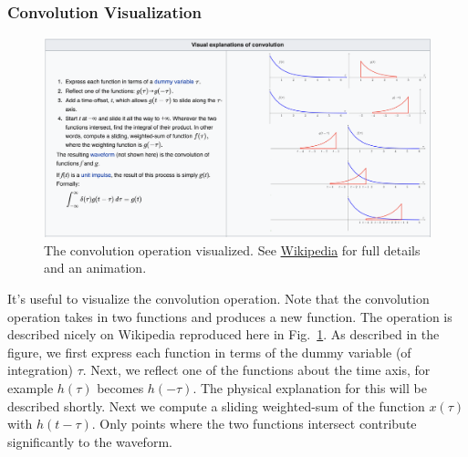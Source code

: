 \subsubsection{Convolution Visualization}
\begin{figure}[tb]
\centering
\includegraphics[width=\columnwidth]{conv_picture.png} 
\caption{The convolution operation visualized.  See \href{https://en.wikipedia.org/wiki/Convolution}{Wikipedia} for full details and an animation. }
\label{fig:conv_visual}
\end{figure}
It's useful to visualize the convolution operation.  Note that the convolution operation takes in two functions and produces a new function.  The operation is described nicely on Wikipedia reproduced here in Fig.~\ref{fig:conv_visual}.  As described in the figure, we first express each function in terms of the dummy variable (of integration) $\tau$.  Next, we reflect one of the functions about the time axis, for example $h(\tau)$ becomes $h(-\tau)$.  The physical explanation for this will be described shortly.  Next we compute a sliding weighted-sum of the function $x(\tau)$ with $h(t-\tau)$.  Only points where the two functions intersect contribute significantly to the waveform.  
